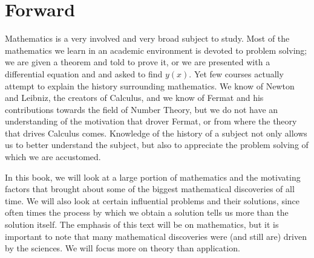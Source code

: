 \section*{Forward}
\noindent

Mathematics is a very involved and very broad subject to study. Most of the mathematics we learn in an academic environment is devoted to problem solving; we are given a theorem and told to prove it, or we are presented with a differential equation and and asked to find $y(x)$. Yet few courses actually attempt to explain the history surrounding mathematics. We know of Newton and Leibniz, the creators of Calculus, and we know of Fermat and his contributions towards the field of Number Theory, but we do not have an understanding of the motivation that drover Fermat, or from where the theory that drives Calculus comes. Knowledge of the history of a subject not only allows us to better understand the subject, but also to appreciate the problem solving of which we are accustomed.

In this book, we will look at a large portion of mathematics and the motivating factors that brought about some of the biggest mathematical discoveries of all time. We will also look at certain influential problems and their solutions, since often times the process by which we obtain a solution tells us more than the solution itself. The emphasis of this text will be on mathematics, but it is important to note that many mathematical discoveries were (and still are) driven by the sciences. We will focus more on theory than application.
